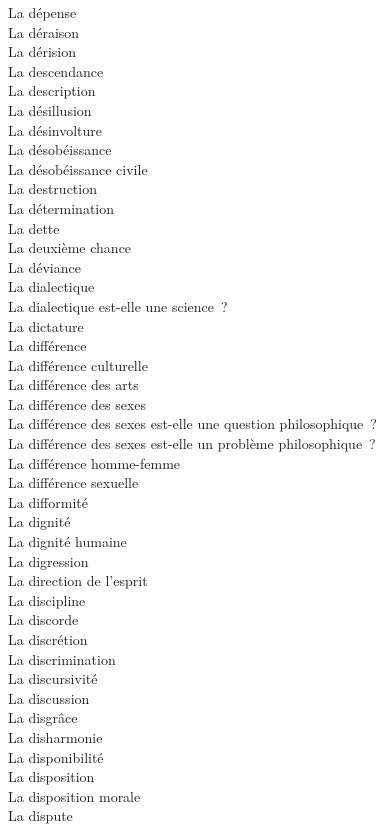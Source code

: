 \documentclass[a4paper,12pt]{article}
\begin{document}
La dépense \\
La déraison \\
La dérision \\
La descendance \\
La description \\
La désillusion \\
La désinvolture \\
La désobéissance \\
La désobéissance civile \\
La destruction \\
La détermination \\
La dette \\
La deuxième chance \\
La déviance \\
La dialectique \\
La dialectique est-elle une science ? \\
La dictature \\
La différence \\
La différence culturelle \\
La différence des arts \\
La différence des sexes \\
La différence des sexes est-elle une question philosophique ? \\
La différence des sexes est-elle un problème philosophique ? \\
La différence homme-femme \\
La différence sexuelle \\
La difformité \\
La dignité \\
La dignité humaine \\
La digression \\
La direction de l'esprit \\
La discipline \\
La discorde \\
La discrétion \\
La discrimination \\
La discursivité \\
La discussion \\
La disgrâce \\
La disharmonie \\
La disponibilité \\
La disposition \\
La disposition morale \\
La dispute \\
\end{document}
